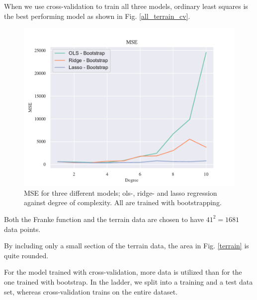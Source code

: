 When we use cross-validation to train all three models, ordinary least squares is the best performing model as shown in Fig. \ref{all_terrain_cv}. 


\begin{figure}[h!]
    \centering
    \includegraphics[width=1\linewidth]{project_1_alt/figures/figures_in_report/All_bootstrap_Terrain.pdf}
    \caption{MSE for three different models; ols-, ridge- and lasso regression against degree of complexity. All are trained with bootstrapping.}
    \label{all_terrain_bs}
\end{figure}



Both the Franke function and the terrain data are chosen to have $41^2 = 1681$ data points. 

By including only a small section of the terrain data, the area in Fig. \ref{terrain} is quite rounded. 


For the model trained with cross-validation, more data is utilized than for the one trained with bootstrap. In the ladder, we split into a training and a test data set, whereas cross-validation trains on the entire dataset. 

